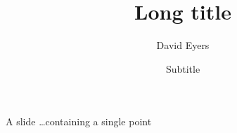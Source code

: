 \documentclass[aspectratio=169,t]{beamer}
\title[Short title]{Long title}
\date{Subtitle}
\author{David Eyers}
\begin{document}
\begin{frame}
  \titlepage
\end{frame}

\begin{dframe}{A slide}
  \1 \dots containing a single point
\end{dframe}
\end{document}
